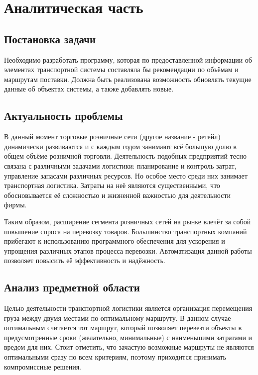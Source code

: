 \section{Аналитическая часть}

\subsection{Постановка задачи}
	Необходимо разработать программу, которая по предоставленной информации об элементах транспортной системы составляла бы рекомендации по объёмам и маршрутам поставки.
	Должна быть реализована возможность обновлять текущие данные об объектах системы, а также добавлять новые.

\subsection{Актуальность проблемы}
	В данный момент торговые розничные сети (другое название - ретейл) динамически развиваются и с каждым годом занимают всё большую долю в общем объёме розничной торговли\cite{subj:demand}. Деятельность подобных предприятий тесно связана с различными задачами логистики: планирование и контроль затрат, управление запасами различных ресурсов. Но особое место среди них занимает транспортная логистика. Затраты на неё являются существенными, что обосновывается её сложностью и жизненной важностью для деятельности фирмы. 
	
	Таким образом, расширение сегмента розничных сетей на рынке влечёт за собой повышение спроса на перевозку товаров. Большинство транспортных компаний прибегают к использованию программного обеспечения для ускорения и упрощения различных этапов процесса перевозки\cite{subj:auto_eff}.  Автоматизация данной работы позволяет повысить её эффективность и надёжность.

\subsection{Анализ предметной области}
	Целью деятельности транспортной логистики является организация перемещения груза между двумя местами по оптимальному маршруту\cite{subj:main}. В данном случае оптимальным считается тот маршрут, который позволяет перевезти объекты в предусмотренные сроки (желательно, минимальные) с наименьшими затратами и вредом для них. Стоит отметить, что зачастую возможные маршруты не являются оптимальными сразу по всем критериям, поэтому приходится принимать компромиссные решения.
	
